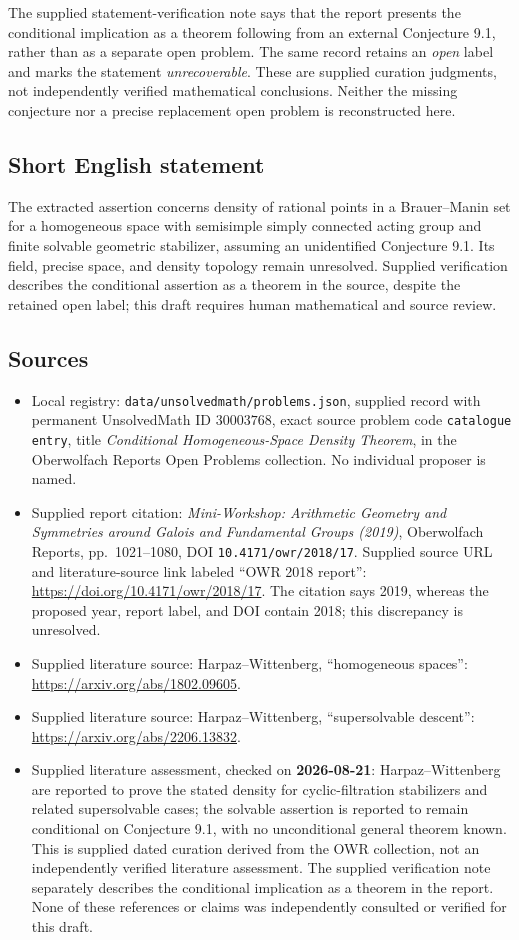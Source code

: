 \documentclass[11pt]{article}
\begin{document}
The supplied statement-verification note says that the report presents the conditional implication as a theorem following from an external Conjecture 9.1, rather than as a separate open problem. The same record retains an \emph{open} label and marks the statement \emph{unrecoverable}. These are supplied curation judgments, not independently verified mathematical conclusions. Neither the missing conjecture nor a precise replacement open problem is reconstructed here.
\subsection{Short English statement}
The extracted assertion concerns density of rational points in a Brauer--Manin set for a homogeneous space with semisimple simply connected acting group and finite solvable geometric stabilizer, assuming an unidentified Conjecture 9.1. Its field, precise space, and density topology remain unresolved. Supplied verification describes the conditional assertion as a theorem in the source, despite the retained open label; this draft requires human mathematical and source review.
\subsection{Sources}
\begin{itemize}
\item Local registry: \texttt{data/unsolvedmath/problems.json}, supplied record with permanent UnsolvedMath ID \(30003768\), exact source problem code \texttt{catalogue entry}, title \emph{Conditional Homogeneous-Space Density Theorem}, in the Oberwolfach Reports Open Problems collection. No individual proposer is named.
\item Supplied report citation: \emph{Mini-Workshop: Arithmetic Geometry and Symmetries around Galois and Fundamental Groups (2019)}, Oberwolfach Reports, pp.~1021--1080, DOI \texttt{10.4171/owr/2018/17}. Supplied source URL and literature-source link labeled ``OWR 2018 report'': \url{https://doi.org/10.4171/owr/2018/17}. The citation says 2019, whereas the proposed year, report label, and DOI contain 2018; this discrepancy is unresolved.
\item Supplied literature source: Harpaz--Wittenberg, ``homogeneous spaces'': \url{https://arxiv.org/abs/1802.09605}.
\item Supplied literature source: Harpaz--Wittenberg, ``supersolvable descent'': \url{https://arxiv.org/abs/2206.13832}.
\item Supplied literature assessment, checked on \textbf{2026-08-21}: Harpaz--Wittenberg are reported to prove the stated density for cyclic-filtration stabilizers and related supersolvable cases; the solvable assertion is reported to remain conditional on Conjecture 9.1, with no unconditional general theorem known. This is supplied dated curation derived from the OWR collection, not an independently verified literature assessment. The supplied verification note separately describes the conditional implication as a theorem in the report. None of these references or claims was independently consulted or verified for this draft.
\end{itemize}
\end{document}
